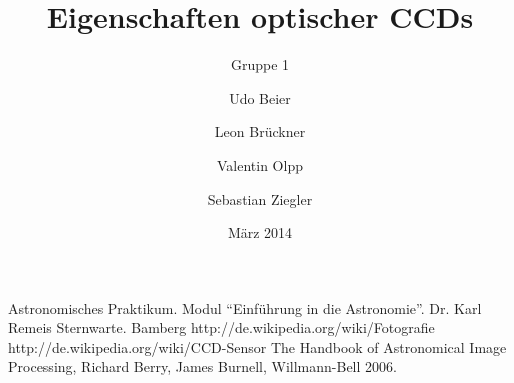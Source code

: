 
%
%


\title{Eigenschaften optischer CCDs}
\subtitle{Gruppe 1}
\date{März 2014}
\author{Udo Beier \and Leon Brückner \and Valentin Olpp \and Sebastian Ziegler}

\maketitle
\tableofcontents
\newpage
\listoffigures
\listoftables
\newpage

\newpage






%
\newpage
%
%

\begin{thebibliography}{9}
 Astronomisches Praktikum. Modul \enquote{Einführung in die Astronomie}. Dr. Karl Remeis Sternwarte. Bamberg
 http://de.wikipedia.org/wiki/Fotografie
 http://de.wikipedia.org/wiki/CCD-Sensor
 The Handbook of Astronomical Image Processing, Richard Berry, James Burnell, Willmann-Bell 2006.
\end{thebibliography}
